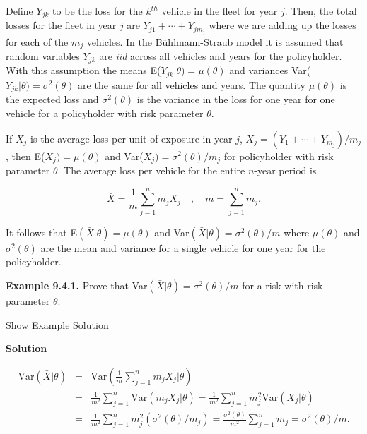 \documentclass[]{book}
\theoremstyle{definition}
\theoremstyle{definition}
\theoremstyle{definition}
\theoremstyle{remark}
\begin{document}
Define \(Y_{jk}\) to be the loss for the \(k^{th}\) vehicle in the fleet
for year \(j\). Then, the total losses for the fleet in year \(j\) are
\(Y_{j1}+\cdots+Y_{jm_j}\) where we are adding up the losses for each of
the \(m_j\) vehicles. In the Bühlmann-Straub model it is assumed that
random variables \(Y_{jk}\) are \emph{iid} across all vehicles and years
for the policyholder. With this assumption the means
E(\(Y_{jk}|\theta)=\mu(\theta)\) and variances
Var(\(Y_{jk}|\theta)=\sigma^2(\theta)\) are the same for all vehicles
and years. The quantity \(\mu(\theta)\) is the expected loss and
\(\sigma^2(\theta)\) is the variance in the loss for one year for one
vehicle for a policyholder with risk parameter \(\theta\).

If \(X_j\) is the average loss per unit of exposure in year \(j\),
\(X_j=(Y_1+\cdots+Y_{m_j})/m_j\), then E(\(X_j)=\mu(\theta)\) and
Var(\(X_j)=\sigma^2(\theta)/m_j\) for policyholder with risk parameter
\(\theta\). The average loss per vehicle for the entire \(n\)-year
period is

\begin{equation*}
\bar{X}= \frac{1}{m} \sum_{j=1}^{n} m_j X_{j} \quad , \quad  m=\sum_{j=1}^{n}  m_j. 
\end{equation*}

It follows that E\((\bar{X}|\theta)=\mu(\theta)\) and
Var\((\bar{X}|\theta)=\sigma^2(\theta)/m\) where \(\mu(\theta)\) and
\(\sigma^2(\theta)\) are the mean and variance for a single vehicle for
one year for the policyholder.

\textbf{Example 9.4.1.} Prove that
Var\((\bar{X}|\theta)=\sigma^2(\theta)/m\) for a risk with risk
parameter \(\theta\).

Show Example Solution

\hypertarget{toggleExampleCred.4.1}{}
\textbf{Solution}

\begin{eqnarray*}
\mathrm{Var}(\bar{X}|\theta)&=&\mathrm{Var}\left(\frac{1}{m} \sum_{j=1}^{n} m_j X_j|\theta \right)\\
                                  &=&\frac{1}{m^2}\sum_{j=1}^{n} \mathrm{Var}(m_j X_{j}|\theta)=\frac{1}{m^2}\sum_{j=1}^{n} m_j^2 \mathrm{Var}(X_j|\theta)\\
                                  &=&\frac{1}{m^2}\sum_{j=1}^{n} m_j^2 (\sigma^2(\theta)/m_j)=\frac{\sigma^2(\theta)}{m^2}\sum_{j=1}^{n} m_j=\sigma^2(\theta)/m.\\
\end{eqnarray*}
\end{document}
